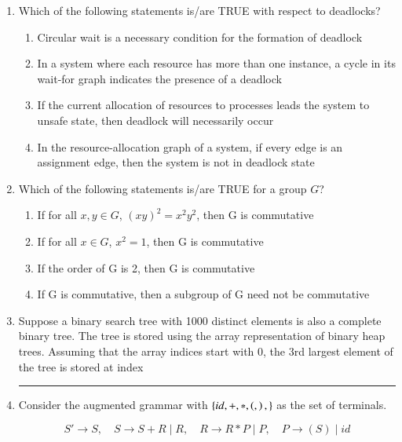 \begin{enumerate}
\hfill{}

\item Which of the following statements is/are TRUE with respect to deadlocks?  

\begin{enumerate}
\item Circular wait is a necessary condition for the formation of deadlock
\item In a system where each resource has more than one instance, a cycle in its wait-for graph indicates the presence of a deadlock
\item If the current allocation of resources to processes leads the system to unsafe state, then deadlock will necessarily occur
\item In the resource-allocation graph of a system, if every edge is an assignment edge, then the system is not in deadlock state
\end{enumerate}

\hfill{}

\item Which of the following statements is/are TRUE for a group $G$?  

\begin{enumerate}
\item If for all $x,y \in G$, $(xy)^2 = x^2y^2$, then G is commutative
\item If for all $x \in G$, $x^2=1$, then G is commutative
\item If the order of G is 2, then G is commutative
\item If G is commutative, then a subgroup of G need not be commutative
\end{enumerate}

\hfill{}

\item Suppose a binary search tree with 1000 distinct elements is also a complete binary tree. The tree is stored using the array representation of binary heap trees. Assuming that the array indices start with 0, the 3rd largest element of the tree is stored at index \rule{2cm}{0.4pt}  

\hfill{}

\item Consider the augmented grammar with $\{id,+,*,\left(,\right),\}$ as the set of terminals.  

\[
S' \to S, \quad S \to S+R \mid R, \quad R \to R*P \mid P, \quad P \to (S) \mid id
\]  


\end{enumerate}

